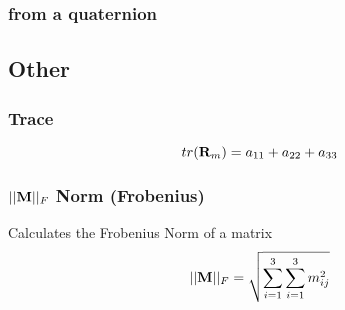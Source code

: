 \subsubsection*{from a quaternion}




\subsection{Other}
\subsubsection*{Trace}
\begin{equation}
tr(\mathbf{R}_m) = a_{11} + a_{22} + a_{33}
\end{equation}

\subsubsection*{$|{|{\mathbf{M}}|}|_F$ Norm (Frobenius)}
Calculates the Frobenius Norm of a matrix
\begin{equation}
|{|{\mathbf{M}}|}|_F = \sqrt{\sum_{i=1}^3 \sum_{i=1}^3 m_{ij}^2 }
\end{equation}
